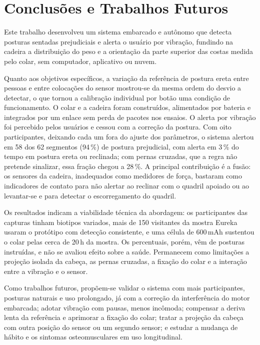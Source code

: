 \chapter{Conclusões e Trabalhos Futuros}\label{cap:conclusao}

Este trabalho desenvolveu um sistema embarcado e autônomo que detecta posturas
sentadas prejudiciais e alerta o usuário por vibração, fundindo na cadeira a
distribuição do peso e a orientação da parte superior das costas medida pelo
colar, sem computador, aplicativo ou nuvem.

Quanto aos objetivos específicos, a variação da referência de postura ereta
entre pessoas e entre colocações do sensor mostrou-se da mesma ordem do desvio
a detectar, o que tornou a calibração individual por botão uma condição de
funcionamento. O colar e a cadeira foram construídos, alimentados por
bateria e integrados por um enlace sem perda de pacotes nos ensaios. O
alerta por vibração foi percebido pelos usuários e cessou com a correção da
postura. Com oito participantes, deixando cada um fora do ajuste dos
parâmetros, o sistema alertou em 58 dos 62 segmentos (94\,\%) de postura prejudicial,
com alerta em 3\,\% do tempo em postura ereta ou reclinada; com pernas
cruzadas, que a regra não pretende sinalizar, essa fração chegou a 28\,\%. A principal contribuição é a fusão: os sensores da cadeira,
inadequados como medidores de força, bastaram como indicadores de contato para
não alertar ao reclinar com o quadril apoiado ou ao levantar-se e para
detectar o escorregamento do quadril.

Os resultados indicam a viabilidade técnica da abordagem: os participantes
das capturas tinham biotipos variados, mais de 150 visitantes da mostra
Eureka usaram o protótipo com detecção consistente, e uma célula de
600\,mAh sustentou o colar pelas cerca de 20\,h da mostra. Os percentuais,
porém, vêm de posturas instruídas, e não se avaliou efeito sobre a saúde.
Permanecem como limitações a projeção isolada da cabeça, as pernas
cruzadas, a fixação do colar e a interação entre a vibração e o sensor.

Como trabalhos futuros, propõem-se validar o sistema com mais participantes,
posturas naturais e uso prolongado, já com a correção da interferência do
motor embarcada; adotar vibração com pausas, menos incômoda; compensar a
deriva lenta da referência e aprimorar a fixação do colar; tratar a projeção
da cabeça com outra posição do sensor ou um segundo sensor; e estudar a
mudança de hábito e os sintomas osteomusculares em uso longitudinal.

